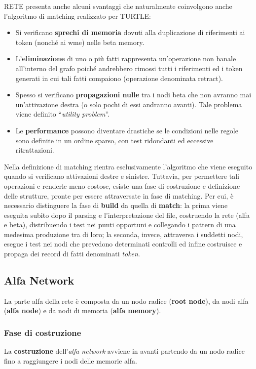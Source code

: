 RETE presenta anche alcuni svantaggi che naturalmente coinvolgono anche l'algoritmo di matching realizzato per TURTLE:
\begin{itemize}
	\item Si verificano \textbf{sprechi di memoria} dovuti alla duplicazione di riferimenti ai token (nonché ai wme) nelle beta memory.
	\item L'\textbf{eliminazione} di uno o più fatti rappresenta un'operazione non banale all'interno del grafo poiché andrebbero rimossi tutti i riferimenti ed i token generati in cui tali fatti compaiono (operazione denominata retract).
	\item Spesso si verificano \textbf{propagazioni nulle} tra i nodi beta che non avranno mai un'attivazione destra (o solo pochi di essi andranno avanti). Tale problema viene definito ``\emph{utility problem}''\cite{minton1990quantitative}.
		\item Le \textbf{performance} possono diventare drastiche se le condizioni nelle regole sono definite in un ordine sparso, con test ridondanti ed eccessive ritrattazioni.
\end{itemize}

Nella definizione di matching rientra esclusivamente l'algoritmo che viene eseguito quando si verificano attivazioni destre e sinistre. Tuttavia, per permettere tali operazioni e renderle meno costose, esiste una fase di costruzione e definizione delle strutture, pronte per essere attraversate in fase di matching. Per cui, è necessario distinguere la fase di \textbf{build} da quella di \textbf{match}: la prima viene eseguita subito dopo il parsing e l'interpretazione del file, costruendo la rete (alfa e beta), distribuendo i test nei punti opportuni e collegando i pattern di una medesima produzione tra di loro; la seconda, invece, attraversa i suddetti nodi, esegue i test nei nodi che prevedono determinati controlli ed infine costruisce e propaga dei record di fatti denominati \emph{token}.

\subsection{Alfa Network}
La parte alfa della rete è composta da un nodo radice (\textbf{root node}), da nodi alfa (\textbf{alfa node}) e da nodi di memoria (\textbf{alfa memory}).

\subsubsection{Fase di costruzione}
La \textbf{costruzione} dell'\emph{alfa network} avviene in avanti partendo da un nodo radice fino a raggiungere i nodi delle memorie alfa.

